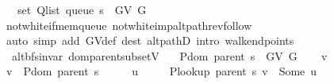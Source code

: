 \begin{isabellebody}
\ \ \ {\isachardoublequoteopen}set\ {\isacharparenleft}{\kern0pt}Q{\isacharunderscore}{\kern0pt}list\ {\isacharparenleft}{\kern0pt}queue\ s{\isacharparenright}{\kern0pt}{\isacharparenright}{\kern0pt}\ {\isasymsubseteq}\ G{\isachardot}{\kern0pt}V\ G{\isachardoublequoteclose}\isanewline
%
\isadelimproof
\ \ %
\endisadelimproof
%
\isatagproof
{}\isamarkupfalse%
\ not{\isacharunderscore}{\kern0pt}white{\isacharunderscore}{\kern0pt}if{\isacharunderscore}{\kern0pt}mem{\isacharunderscore}{\kern0pt}queue\ not{\isacharunderscore}{\kern0pt}white{\isacharunderscore}{\kern0pt}imp{\isacharunderscore}{\kern0pt}alt{\isacharunderscore}{\kern0pt}path{\isacharunderscore}{\kern0pt}rev{\isacharunderscore}{\kern0pt}follow\isanewline
\ \ \isamarkupfalse%
\ {\isacharparenleft}{\kern0pt}auto\ simp\ add{\isacharcolon}{\kern0pt}\ G{\isachardot}{\kern0pt}V{\isacharunderscore}{\kern0pt}def\ dest{\isacharcolon}{\kern0pt}\ alt{\isacharunderscore}{\kern0pt}pathD{\isacharparenleft}{\kern0pt}{}{\isacharparenright}{\kern0pt}\ intro{\isacharcolon}{\kern0pt}\ walk{\isacharunderscore}{\kern0pt}endpoints{\isacharparenleft}{\kern0pt}{}{\isacharparenright}{\kern0pt}{\isacharparenright}{\kern0pt}%
\endisatagproof
{\isafoldproof}%
%
\isadelimproof
\isanewline
%
\endisadelimproof
\isanewline
{}\isamarkupfalse%
\ {\isacharparenleft}{\kern0pt}\ alt{\isacharunderscore}{\kern0pt}bfs{\isacharunderscore}{\kern0pt}invar{\isacharparenright}{\kern0pt}\ dom{\isacharunderscore}{\kern0pt}parent{\isacharunderscore}{\kern0pt}subset{\isacharunderscore}{\kern0pt}V{\isacharcolon}{\kern0pt}\isanewline
\ \ \ {\isachardoublequoteopen}P{\isachardot}{\kern0pt}dom\ {\isacharparenleft}{\kern0pt}parent\ s{\isacharparenright}{\kern0pt}\ {\isasymsubseteq}\ G{\isachardot}{\kern0pt}V\ G{\isachardoublequoteclose}\isanewline
%
\isadelimproof
%
\endisadelimproof
%
\isatagproof
{}\isamarkupfalse%
\isanewline
\ \ \isamarkupfalse%
\ v\isanewline
\ \ \isamarkupfalse%
\ {\isachardoublequoteopen}v\ {\isasymin}\ P{\isachardot}{\kern0pt}dom\ {\isacharparenleft}{\kern0pt}parent\ s{\isacharparenright}{\kern0pt}{\isachardoublequoteclose}\isanewline
\ \ \isamarkupfalse%
\ \isamarkupfalse%
\ u\ \isanewline
\ \ \ \ {\isachardoublequoteopen}P{\isacharunderscore}{\kern0pt}lookup\ {\isacharparenleft}{\kern0pt}parent\ s{\isacharparenright}{\kern0pt}\ v\ {\isacharequal}{\kern0pt}\ Some\ u{\isachardoublequoteclose}\isanewline

\end{isabellebody}
